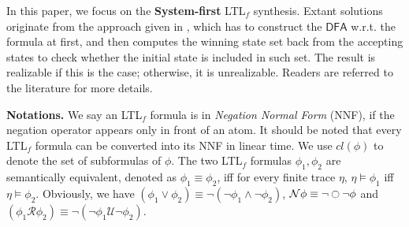 \documentclass[letterpaper]{article} %
\newcommand{\N}{\mathcal{N}} \newcommand{\R}{\mathcal{R}} \newcommand{\A}{\mathcal{A}}
\newcommand{\U}{\mathcal{U}} \newcommand{\V}{\mathcal{V}} %
\newcommand{\ltlf}{\textsf{LTL}$_f$\xspace}
\def\dfa{$\mathsf{DFA}$\xspace}
\newcommand{\NNF}{{\sf NNF}\xspace}
\begin{document}
In this paper, we focus on the \textbf{System-first} \ltlf synthesis. Extant solutions originate from the approach given in \citep{GV15}, which has to construct the \dfa w.r.t. the formula at first, and then computes the winning state set back from the accepting states to check whether the initial state is included in such set. The result is realizable if this is the case; otherwise, it is unrealizable. Readers are referred to the literature for more details. 

\noindent\textbf{Notations.} 
We say an \ltlf formula is in \emph{Negation Normal Form} (\NNF), if the negation operator appears only in front of an atom. It should be noted that every \ltlf formula can be converted into its \NNF in linear time. We use $cl(\phi)$ to denote the set of subformulas of $\phi$. %
The two \ltlf formulas $\phi_1,\phi_2$ are semantically equivalent, denoted as $\phi_1\equiv\phi_2 $, iff for every finite trace $\eta$, $\eta\models\phi_1$ iff $\eta\models\phi_2$.  Obviously, we have $(\phi_1\vee\phi_2)\equiv \neg (\neg\phi_1 \wedge\neg \phi_2)$, $\N\phi\equiv \neg \ocircle\neg\phi$ and $(\phi_1 \R\phi_2)\equiv \neg (\neg\phi_1 \U\neg \phi_2)$.





%
\end{document}
